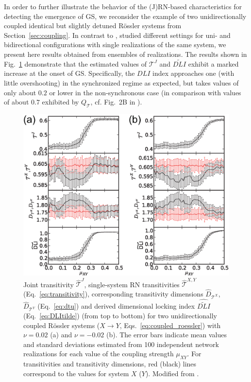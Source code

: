 		In order to further illustrate the behavior of the (J)RN-based characteristics for detecting the emergence of GS, we reconsider the example of two unidirectionally coupled identical but slightly detuned R\"ossler systems from Section~\ref{sec:coupling}. In contrast to \cite{Feldhoff2013}, \cite{Donner2015RPBook} studied different settings for uni- and bidirectional configurations with single realizations of the same system, we present here results obtained from ensembles of realizations. The results shown in Fig.~\ref{fig:roessler_sync} demonstrate that the estimated values of $\mathcal{T}^J$ and $\widetilde{DLI}$ exhibit a marked increase at the onset of GS. Specifically, the $DLI$ index approaches one (with little overshooting) in the synchronized regime as expected, but takes values of only about $0.2$ or lower in the non-synchronous case (in comparison with values of about $0.7$ exhibited by $Q_{\mathcal{T}}$, cf. Fig.~2B in \cite{Feldhoff2013}).
\begin{figure}
	\centering
	\includegraphics[scale=0.6]{Chapter03_RecurrenceNt/funnelK51R100+nu.eps}
\caption{Joint transitivity $\hat{\mathcal{T}}^J$, single-system RN transitivities $\hat{\mathcal{T}}^{X,Y}$ (Eq.~\ref{eq:transitivity}), corresponding transitivity dimensions $\hat{D}_{\mathcal{T}^X}$, $\hat{D}_{\mathcal{T}^Y}$ (Eq.~\ref{eq:dtu}) and derived dimensional locking index $\widehat{{\widetilde{DLI}}}$ (Eq.~\eqref{eq:DLItilde}) (from top to bottom) for two unidirectionally coupled R\"ossler systems ($X\to Y$, Eqs.~\ref{eq:coupled_roessler}) with $\nu=0.02$ (a) and $\nu=-0.02$ (b). The error bars indicate mean values and standard deviations estimated from 100 independent network realizations for each value of the coupling strength $\mu_{XY}$. For transitivities and transitivity dimensions, red (black) lines correspond to the values for system $X$ ($Y$). Modified from \cite{Feldhoff2013}. }
\label{fig:roessler_sync}
\end{figure}

